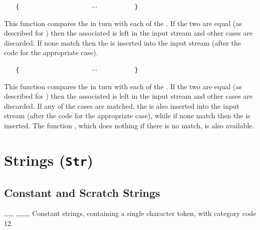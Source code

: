 \documentclass[oneside]{book}
\begin{document}
\begin{function}{\TlVarCaseF}
\begin{syntax}
 
~ ~ \verb"{"
~ ~ ~ ~  
~ ~ ~ ~  
~ ~ ~ ~ $\cdots$
~ ~ ~ ~  
~ ~ \verb"}"
~ ~ 
\end{syntax}
This function compares the  in turn
with each of the . If the two
are equal (as described for )
then the associated  is left in the input
stream and other cases are discarded. If none
match then the  is inserted into the input stream
 (after the code for the appropriate case).
\end{function}

\begin{function}{\TlVarCaseTF}
\begin{syntax}
 
~ ~ \verb"{"
~ ~ ~ ~  
~ ~ ~ ~  
~ ~ ~ ~ $\cdots$
~ ~ ~ ~  
~ ~ \verb"}"
~ ~ 
~ ~ 
\end{syntax}
This function compares the  in turn
with each of the . If the two
are equal (as described for )
then the associated  is left in the input
stream and other cases are discarded. If any of the
cases are matched, the  is also inserted into the
input stream (after the code for the appropriate case), while if none
match then the  is inserted. The function
, which does nothing if there is no match, is also
available.
\end{function}

\chapter{Strings (\texttt{Str})}

\section{Constant and Scratch Strings}

\begin{variable}{\cAmpersandStr,\cAtsignStr,\cBackslashStr,\cLeftBraceStr,\cRightBraceStr,
\cCircumflexStr,\cColonStr,\cDollarStr,\cHashStr,\cPercentStr,\cTildeStr,\cUnderscoreStr,\cZeroStr}
Constant strings, containing a single character token, with category code $12$.
\end{variable}
\end{document}
